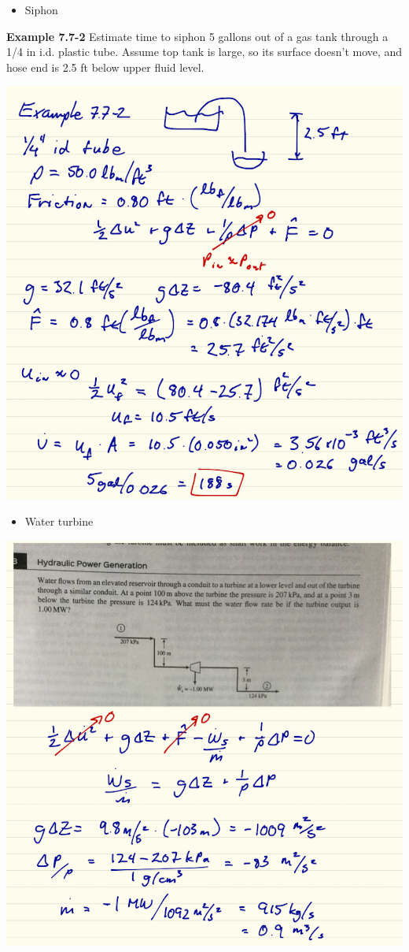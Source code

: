 \documentclass[11pt]{article}
\begin{document}
\begin{itemize}
\item Siphon
\end{itemize}

\begin{framed}
\noindent \textbf{Example 7.7-2} Estimate time to siphon 5 gallons out of a gas tank through a 1/4 in i.d. plastic tube.  Assume top tank is large, so its surface doesn't move, and hose end is 2.5 ft below upper fluid level.
\end{framed}

\includegraphics[width=.9\linewidth]{./figs/Example772.png}

\begin{itemize}
\item Water turbine
\end{itemize}

\includegraphics[width=.9\linewidth]{./figs/Example773.png}
\end{document}
